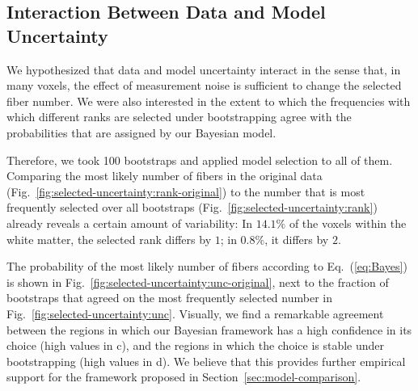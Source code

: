\subsection{Interaction Between Data and Model Uncertainty}
\label{sec:data-vs-model-uncertainty}

We hypothesized that data and model uncertainty interact in the sense that, in many voxels, the effect of measurement noise is sufficient to change the selected fiber number. We were also interested in the extent to which the frequencies with which different ranks are selected under bootstrapping agree with the probabilities that are assigned by our Bayesian model.

Therefore, we took 100 bootstraps and applied model
selection to all of them. Comparing the most
likely number of fibers in the original data (Fig.~\ref{fig:selected-uncertainty:rank-original}) to the number that is most frequently selected over all bootstraps (Fig.~\ref{fig:selected-uncertainty:rank}) already reveals a certain amount of variability: In $14.1\%$ of the voxels within the white matter, the selected rank differs
by $1$; in $0.8\%$, it differs by $2$.

The probability of the most likely number of fibers according to Eq.~(\ref{eq:Bayes}) is
shown in Fig.~\ref{fig:selected-uncertainty:unc-original}, next to the fraction of bootstraps that agreed on the most frequently selected number in Fig.~\ref{fig:selected-uncertainty:unc}. Visually, we find a remarkable agreement between the regions in which our Bayesian framework has a high confidence in its choice (high values in c), and the regions in which the choice is stable under bootstrapping (high values in d). We believe that this provides further empirical support for the framework proposed in Section~\ref{sec:model-comparison}.

